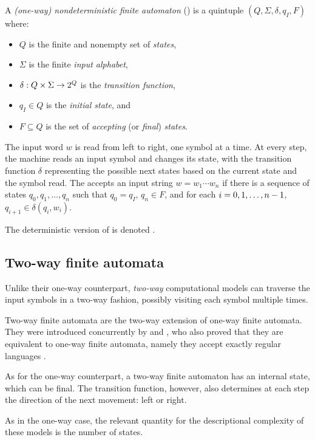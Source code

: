 \begin{defn}
	A \emph{(one-way) nondeterministic finite automaton} (\ONFA) is a quintuple $(Q,\Sigma,\delta,q_I,F)$ where:
	\begin{itemize}
		\item $Q$ is the finite and nonempty set of \emph{states},
		\item $\Sigma$ is the finite \emph{input alphabet},
		\item $\delta:Q\times\Sigma\to2^{Q}$ is the \emph{transition function},
		\item $q_I\in Q$ is the \emph{initial state}, and
		\item $F\subseteq Q$ is the set of \emph{accepting} (or \emph{final}) \emph{states}.
	\end{itemize}
	The input word $w$ is read from left to right, one symbol at a time.
	At every step, the machine reads an input symbol and changes its state, with the transition function $\delta$ representing the possible next states based on the current state and the symbol read.
	The \ONFA accepts an input string $w=w_1\cdots w_n$ if there is a sequence of states $q_0,q_1,\dots,q_n$ such that $q_0=q_I$, $q_n\in F$, and for each $i=0,1,\dots,n-1$, $q_{i+1}\in\delta(q_i,w_i)$.

	\noindent The deterministic version of \ONFAs is denoted \ODFAs.
\end{defn}


\subsection{Two-way finite automata}
Unlike their one-way counterpart, \emph{two-way} computational models can traverse the input symbols in a two-way fashion, possibly visiting each symbol multiple times.

Two-way finite automata are the two-way extension of one-way finite automata.
They were introduced concurrently by \citeauthor{RabSco59} and \citeauthor{She59}, who also proved that they are equivalent to one-way finite automata, namely they accept exactly regular languages \cite{RabSco59,She59}.

As for the one-way counterpart, a two-way finite automaton has an internal state, which can be final.
The transition function, however, also determines at each step the direction of the next movement: left or right.

As in the one-way case, the relevant quantity for the descriptional complexity of these models is the number of states.

